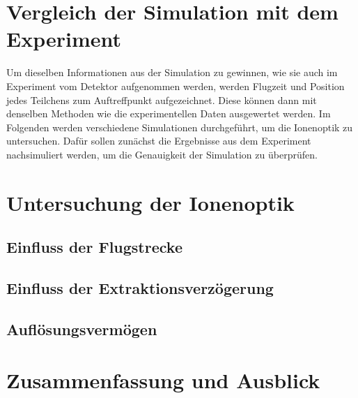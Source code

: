\section{Vergleich der Simulation mit dem Experiment}
Um dieselben Informationen aus der Simulation zu gewinnen, wie sie auch im Experiment vom Detektor aufgenommen werden, werden Flugzeit und Position jedes Teilchens zum Auftreffpunkt aufgezeichnet. Diese können dann mit denselben Methoden wie die experimentellen Daten ausgewertet werden. Im Folgenden werden verschiedene Simulationen durchgeführt, um die Ionenoptik zu untersuchen. Dafür sollen zunächst die Ergebnisse aus dem Experiment nachsimuliert werden, um die Genauigkeit der Simulation zu überprüfen. 


\section{Untersuchung der Ionenoptik}
\subsection{Einfluss der Flugstrecke}
\subsection{Einfluss der Extraktionsverzögerung}
\subsection{Auflösungsvermögen}

\section{Zusammenfassung und Ausblick}